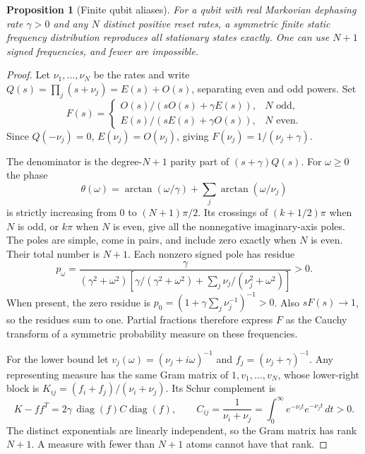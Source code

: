 \documentclass[11pt,a4paper]{article}
\newtheorem{proposition}[theorem]{Proposition}
\newcommand{\diag}{\operatorname{diag}}
\begin{document}
\begin{proposition}[Finite qubit aliases]\label{prop:qubit}
For a qubit with real Markovian dephasing rate $\gamma>0$ and any
$N$ distinct positive reset rates, a symmetric finite static frequency
distribution reproduces all stationary states exactly. One can use
$N+1$ signed frequencies, and fewer are impossible.
\end{proposition}
\begin{proof}
Let $\nu_1,\ldots,\nu_N$ be the rates and write
$Q(s)=\prod_j(s+\nu_j)=E(s)+O(s)$, separating even and odd powers.
Set
\begin{equation}\label{eq:qubitF}
 F(s)=
 \begin{cases}
 O(s)/(sO(s)+\gamma E(s)),&N\text{ odd},\\
 E(s)/(sE(s)+\gamma O(s)),&N\text{ even}.
 \end{cases}
\end{equation}
Since $Q(-\nu_j)=0$, $E(\nu_j)=O(\nu_j)$, giving
$F(\nu_j)=1/(\nu_j+\gamma)$.

The denominator is the degree-$N+1$ parity part of
$(s+\gamma)Q(s)$. For $\omega\geq0$ the phase
\[
 \theta(\omega)=\arctan(\omega/\gamma)
                  +\sum_j\arctan(\omega/\nu_j)
\]
is strictly increasing from $0$ to $(N+1)\pi/2$. Its crossings of
$(k+1/2)\pi$ when $N$ is odd, or $k\pi$ when $N$ is even,
give all the nonnegative imaginary-axis poles. The poles are simple,
come in pairs, and include zero exactly when $N$ is even. Their total
number is $N+1$. Each nonzero signed pole has residue
\begin{equation}\label{eq:mass}
 p_\omega=\frac{\gamma}{(\gamma^2+\omega^2)
 [\gamma/(\gamma^2+\omega^2)+\sum_j\nu_j/(\nu_j^2+\omega^2)]}>0.
\end{equation}
When present, the zero residue is
$p_0=(1+\gamma\sum_j\nu_j^{-1})^{-1}>0$.
Also $sF(s)\to1$, so the residues sum to one. Partial fractions
therefore express $F$ as the Cauchy transform of a symmetric
probability measure on these frequencies.

For the lower bound let $v_j(\omega)=(\nu_j+i\omega)^{-1}$ and
$f_j=(\nu_j+\gamma)^{-1}$. Any representing measure has the same
Gram matrix of $1,v_1,\ldots,v_N$, whose lower-right block is
$K_{ij}=(f_i+f_j)/(\nu_i+\nu_j)$. Its Schur complement is
\[
 K-ff^T=2\gamma\,\diag(f)C\diag(f),\qquad
 C_{ij}=\frac1{\nu_i+\nu_j}
       =\int_0^\infty e^{-\nu_i t}e^{-\nu_j t}\,dt>0.
\]
The distinct exponentials are linearly independent, so the Gram
matrix has rank $N+1$. A measure with fewer than $N+1$ atoms
cannot have that rank.
\end{proof}
\end{document}
